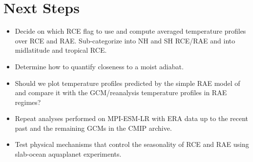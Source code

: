 \documentclass[11pt]{article}
\begin{document}
\section{Next Steps}
\label{sec:org65d6f89}
\begin{itemize}
\item Decide on which RCE flag to use and compute averaged temperature profiles over RCE and RAE. Sub-categorize into NH and SH RCE/RAE and into midlatitude and tropical RCE.
\item Determine how to quantify closeness to a moist adiabat.
\item Should we plot temperature profiles predicted by the simple RAE model of \cite{cronin2016} and compare it with the GCM/reanalysis temperature profiles in RAE regimes?
\item Repeat analyses performed on MPI-ESM-LR with ERA data up to the recent past and the remaining GCMs in the CMIP archive.
\item Test physical mechanisms that control the seasonality of RCE and RAE using slab-ocean aquaplanet experiments.
\end{itemize}



\end{document}
